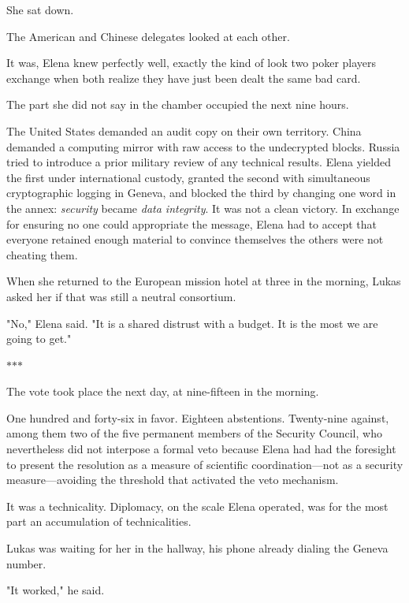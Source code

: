 \documentclass[11pt,a5paper,twoside]{book}
\begin{document}
She sat down.

The American and Chinese delegates looked at each other.

It was, Elena knew perfectly well, exactly the kind of look two poker players exchange when both realize they have just been dealt the same bad card.

The part she did not say in the chamber occupied the next nine hours.

The United States demanded an audit copy on their own territory. China demanded a computing mirror with raw access to the undecrypted blocks. Russia tried to introduce a prior military review of any technical results. Elena yielded the first under international custody, granted the second with simultaneous cryptographic logging in Geneva, and blocked the third by changing one word in the annex: \textit{security} became \textit{data integrity}. It was not a clean victory. In exchange for ensuring no one could appropriate the message, Elena had to accept that everyone retained enough material to convince themselves the others were not cheating them.

When she returned to the European mission hotel at three in the morning, Lukas asked her if that was still a neutral consortium.

"No," Elena said. "It is a shared distrust with a budget. It is the most we are going to get."

\vspace{1.5em}
\begin{center}$\ast$\quad$\ast$\quad$\ast$\end{center}
\vspace{1.5em}

The vote took place the next day, at nine-fifteen in the morning.

One hundred and forty-six in favor. Eighteen abstentions. Twenty-nine against, among them two of the five permanent members of the Security Council, who nevertheless did not interpose a formal veto because Elena had had the foresight to present the resolution as a measure of scientific coordination—not as a security measure—avoiding the threshold that activated the veto mechanism.

It was a technicality. Diplomacy, on the scale Elena operated, was for the most part an accumulation of technicalities.

Lukas was waiting for her in the hallway, his phone already dialing the Geneva number.

"It worked," he said.
\end{document}
